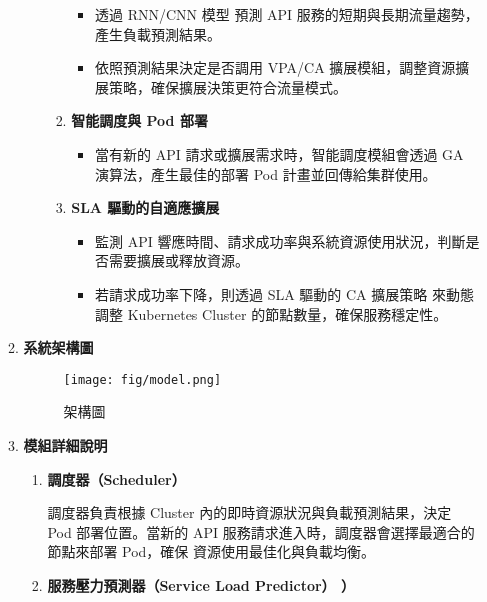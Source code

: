 \documentclass[12pt,a4paper]{article}
\begin{document}
\begin{enumerate}[label={(\zhdig*)}, leftmargin=2\parindent, listparindent=\parindent]
\begin{enumerate}[label={(\arabic*)}, leftmargin=\parindent, listparindent=\parindent]
\begin{enumerate}[label={(\zhdig*)}, leftmargin=\parindent, listparindent=\parindent]
\begin{enumerate}[label={(\arabic*)}, leftmargin=\parindent, listparindent=\parindent]
\begin{itemize}[leftmargin=\parindent, listparindent=\parindent]
    \item 透過 RNN/CNN 模型 預測 API 服務的短期與長期流量趨勢，產生負載預測結果。
    \item 依照預測結果決定是否調用 VPA/CA 擴展模組，調整資源擴展策略，確保擴展決策更符合流量模式。
\end{itemize}
    \item\textbf{
智能調度與 Pod 部署}
\begin{itemize}[leftmargin=\parindent, listparindent=\parindent]
    \item 當有新的 API 請求或擴展需求時，智能調度模組會透過 GA 演算法，產生最佳的部署 Pod 計畫並回傳給集群使用。
\end{itemize}
\item\textbf{SLA 驅動的自適應擴展}
\begin{itemize}[leftmargin=\parindent, listparindent=\parindent]
    \item 監測 API 響應時間、請求成功率與系統資源使用狀況，判斷是否需要擴展或釋放資源。
    \item 若請求成功率下降，則透過 SLA 驅動的 CA 擴展策略 來動態調整 Kubernetes Cluster 的節點數量，確保服務穩定性。
\end{itemize}


\end{enumerate}

\end{enumerate}
    \item \textbf{
系統架構圖}

\begin{figure} [htbp]

\centering

\texttt{[image: fig/model.png]}

\caption{架構圖}

\end{figure}\newpage

\item \textbf{
模組詳細說明}
\begin{enumerate}[label={(\zhdig*)}, leftmargin=\parindent, listparindent=\parindent]

    \item \textbf{
調度器（Scheduler）}

調度器負責根據 Cluster 內的即時資源狀況與負載預測結果，決定 Pod 部署位置。當新的 API 服務請求進入時，調度器會選擇最適合的節點來部署 Pod，確保 資源使用最佳化與負載均衡。

    \item \textbf{
服務壓力預測器（Service Load Predictor）
）}


\end{enumerate}
\end{enumerate}
\end{enumerate}
\end{document}
